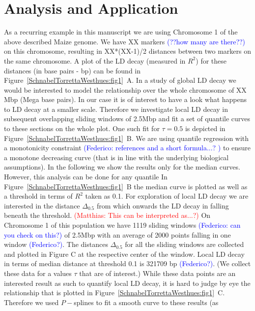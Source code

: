 \documentclass[twoside]{report}
\begin{document}
\section{Analysis and Application}

As a recurring example in this manuscript we are using Chromosome 1 of the above described 
	Maize genome. We have XX markers \textcolor{blue}{(??how many are there??)} 
	on this chromosome, resulting in XX*(XX-1)/2 distances 
	between two markers on the same chromosome. A plot of the LD decay (measured in $R^2$) 
	for these distances (in base pairs - bp) can be found 
	in Figure~\ref{SchnabelTorrettaWesthues:fig1}~A. 
	In a study of global 
	LD decay we would be interested to model the relationship over the whole chromosome of 
	XX Mbp (Mega base pairs). In our case it is of interest to have a look what happens to 
	LD decay at a smaller scale. Therefore we investigate local LD decay in subsequent 
	overlapping sliding windows of 2.5Mbp and fit a set of quantile curves to these 
	sections on the whole plot. One such fit for $\tau = 0.5$ is depicted 
	in Figure~\ref{SchnabelTorrettaWesthues:fig1}~B. 
	We are using quantile 
	regression with a monotonicity constraint 
	\textcolor{blue}{(Federico: references and a short formula...? )} 
	to ensure a monotone decreasing curve (that is 
	in line with the underlying biological assumptions). In the following we show the 
	results only for the median curves. However, this analysis can be done for any quantile  
	In Figure~\ref{SchnabelTorrettaWesthues:fig1}~B the median curve is 
	plotted as well as a threshold in terms of $R^2$ taken as 
	0.1. For exploration of local LD decay we are interested in the distance $\Delta_{0.5}$ from 
	which onwards the LD decay in falling beneath the threshold. \textcolor{red}{(Matthias: This can be interpreted
	 as...?)}
	On Chromosome 1 of this population we have 1119 sliding windows \textcolor{blue}
	{(Federico: can you check on this?)}
	 of 2.5Mbp with an 
	average of 2000 points falling in one window \textcolor{blue}{(Federico?)}. The distances 
	$\Delta_{0.5}$ for all the sliding windows are collected and plotted in Figure C 
	at the respective center of the window. Local 
	LD decay in terms of median distance at threshold 0.1 is 321709 bp 
	\textcolor{blue}{(Federico?)}. 
	(We collect these data for a 
	values $\tau$ that are of interest.) While these data points are an interested result as
	such to quantify local LD decay, it is hard to judge by eye the relationship that is plotted in 
	Figure~\ref{SchnabelTorrettaWesthues:fig1}~C. Therefore we used $P-$splines to fit a smooth curve to these results (as 
\end{document}
